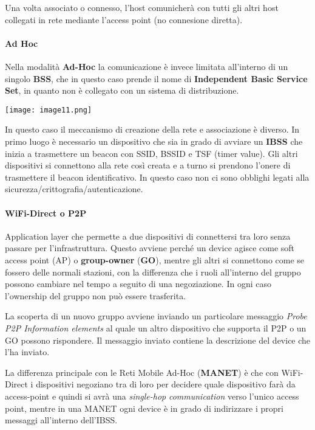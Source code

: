 Una volta associato o connesso, l'host comunicherà con tutti gli altri
host collegati in rete mediante l'access point (no connesione diretta).

\paragraph{Ad Hoc}\label{ad-hoc}

Nella modalità \textbf{Ad-Hoc} la comunicazione è invece limitata
all'interno di un singolo \textbf{BSS}, che in questo caso prende il
nome di \textbf{Independent Basic Service Set}, in quanto non è
collegato con un sistema di distribuzione.

\texttt{[image: image11.png]}

In questo caso il meccanismo di creazione della rete e associazione è
diverso. In primo luogo è necessario un dispositivo che sia in grado di
avviare un \textbf{IBSS} che inizia a trasmettere un beacon con SSID,
BSSID e TSF (timer value). Gli altri dispositivi si connettono alla rete
così creata e a turno si prendono l'onere di trasmettere il beacon
identificativo. In questo caso non ci sono obblighi legati alla
sicurezza/crittografia/autenticazione.

\paragraph{WiFi-Direct o P2P}\label{wifi-direct-o-p2p}

Application layer che permette a due dispositivi di connettersi tra loro
senza passare per l'infrastruttura. Questo avviene perché un device
agisce come soft access point (AP) o \textbf{group-owner} (\textbf{GO}),
mentre gli altri si connettono come se fossero delle normali stazioni,
con la differenza che i ruoli all'interno del gruppo possono cambiare
nel tempo a seguito di una negoziazione. In ogni caso l'ownership del
gruppo non può essere trasferita.

La scoperta di un nuovo gruppo avviene inviando un particolare messaggio
\emph{Probe} \emph{P2P Information elements} al quale un altro
dispositivo che supporta il P2P o un GO possono rispondere. Il messaggio
inviato contiene la descrizione del device che l'ha inviato.

La differenza principale con le Reti Mobile Ad-Hoc (\textbf{MANET}) è
che con WiFi-Direct i dispositivi negoziano tra di loro per decidere
quale dispositivo farà da access-point e quindi si avrà una
\emph{single-hop} \emph{communication} verso l'unico access point,
mentre in una MANET ogni device è in grado di indirizzare i propri
messaggi all'interno dell'IBSS.

